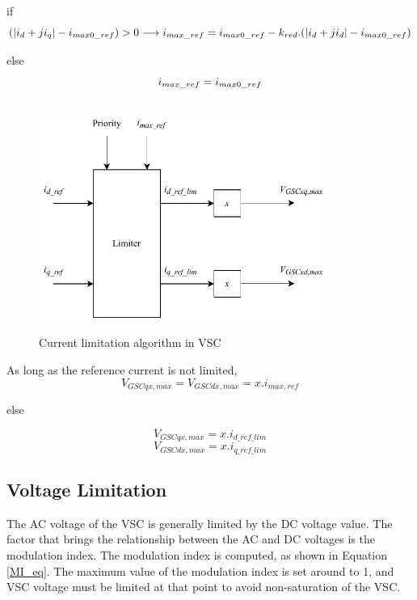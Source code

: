 if
\begin{equation} \label{currentlimeq1}
  (|i_d+ji_q|-i_{max0\_ref})>0 \longrightarrow i_{max\_ref} = i_{max0\_ref} - k_{red} .(|i_d+ji_d|-i_{max0\_ref}) \\
\end{equation}

else
\begin{equation}\label{currentlimeq2}
    \\
  i_{max\_ref} = i_{max0\_ref}  
 \end{equation}
 
\begin{figure}[H]
\centering
    \includegraphics[height = 7.5cm,width = 9.5cm]{Diagrams/Chapter_3/Current_Limiter_block.pdf}
    \caption{Current limitation algorithm in VSC \cite{korai_dynamic_2019}}
    \label{fig:Current_Limiter_block}
\end{figure}

As long as the reference current is not limited,
\begin{equation}\label{vol_lim_1}
    V_{GSCqx,max} = V_{GSCdx,max} = x . i_{max,ref}
\end{equation}

else

\begin{equation}\label{vol_lim_2}
    V_{GSCqx,max} = x . i_{d\_ref\_lim} 
\end{equation}
\begin{equation}\label{vol_lim_3}
    V_{GSCdx,max} = x . i_{q\_ref\_lim}
\end{equation}

\subsection{Voltage Limitation}
The \gls{AC} voltage of the \gls{VSC} is generally limited by the \gls{DC} voltage value. The factor that brings the relationship between the \gls{AC} and \gls{DC} voltages is the modulation index. The modulation index is computed, as shown in Equation \ref{MI_eq}. The maximum value of the modulation index is set around to 1, and \gls{VSC} voltage must be limited at that point to avoid non-saturation of the \gls{VSC}. 

